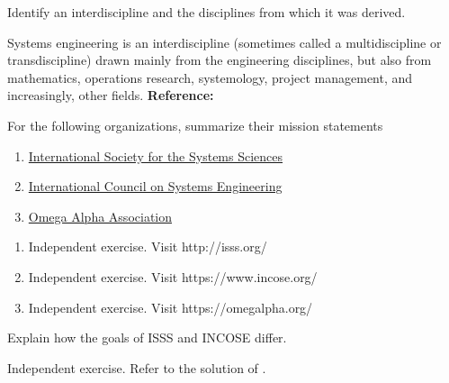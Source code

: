 \begin{exercises}
    \begin{exercise} 
    \label{sea-1-33}
        Identify an interdiscipline and the disciplines from which it was derived.
    \end{exercise}
    \begin{solution}
        Systems engineering is an interdiscipline (sometimes called a multidiscipline or transdiscipline) drawn mainly from the engineering disciplines, but also from mathematics, operations research, systemology, project management, and increasingly, other fields. \textbf{Reference:}
    \end{solution}
    
    \begin{exercise} 
    \label{sea-1-35_36_38}
        For the following organizations, summarize their mission statements
        \begin{enumerate}[label=\alph*)]
            \item \href{http://isss.org/}{International Society for the Systems Sciences}
            \item \href{https://www.incose.org/}{International Council on Systems Engineering}
            \item \href{https://omegalpha.org/}{Omega Alpha Association}
        \end{enumerate}
    \end{exercise}
    \begin{solution}
        \begin{enumerate}[label=\alph*)]
            \item Independent exercise. Visit http://isss.org/
            \item Independent exercise. Visit https://www.incose.org/
            \item Independent exercise. Visit https://omegalpha.org/
        \end{enumerate}
    \end{solution}
    
    \begin{exercise} 
    \label{sea-1-37}
        Explain how the goals of ISSS and INCOSE differ.
    \end{exercise}
    \begin{solution}
        Independent exercise. Refer to the solution of .
    \end{solution}
\end{exercises}
